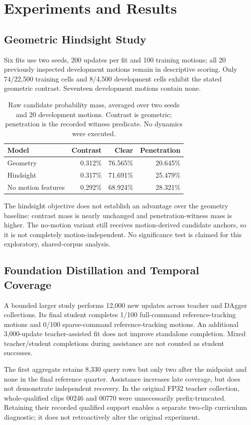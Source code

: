\documentclass[10pt,twocolumn]{article}
\begin{document}
\section{Experiments and Results}
\subsection{Geometric Hindsight Study}
Six fits use two seeds, 200 updates per fit and 100 training motions; all 20 previously inspected development motions remain in descriptive scoring. Only 74/22,500 training cells and 8/4,500 development cells exhibit the stated geometric contrast. Seventeen development motions contain none.

\begin{table}[t]
\centering\small
\begin{tabular}{lrrr}\toprule
Model & Contrast & Clear & Penetration\\\midrule
Geometry & 0.312\% & 76.565\% & 20.645\%\\
Hindsight & 0.317\% & 71.691\% & 25.479\%\\
No motion features & 0.292\% & 68.924\% & 28.321\%\\\bottomrule
\end{tabular}
\caption{Raw candidate probability mass, averaged over two seeds and 20 development motions. Contrast is geometric; penetration is the recorded witness predicate. No dynamics were executed.}
\end{table}
The hindsight objective does not establish an advantage over the geometry baseline: contrast mass is nearly unchanged and penetration-witness mass is higher. The no-motion variant still receives motion-derived candidate anchors, so it is not completely motion-independent. No significance test is claimed for this exploratory, shared-corpus analysis.

\subsection{Foundation Distillation and Temporal Coverage}
A bounded larger study performs 12,000 new updates across teacher and DAgger collections. Its final student completes 1/100 full-command reference-tracking motions and 0/100 sparse-command reference-tracking motions. An additional 3,000-update teacher-assisted fit does not improve standalone completion. Mixed teacher/student completions during assistance are not counted as student successes.

The first aggregate retains 8,330 query rows but only two after the midpoint and none in the final reference quarter. Assistance increases late coverage, but does not demonstrate independent recovery. In the original FP32 teacher collection, whole-qualified clips 00246 and 00770 were unnecessarily prefix-truncated. Retaining their recorded qualified support enables a separate two-clip curriculum diagnostic; it does not retroactively alter the original experiment.
\end{document}
